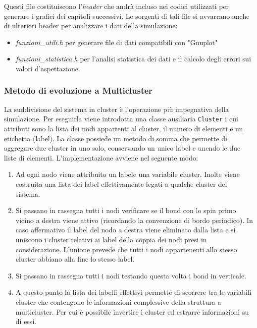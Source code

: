 \documentclass[11pt]{article}
\theoremstyle{plain}
\begin{document}
Questi file costituiscono l'\emph{header} che andrà incluso nei codici utilizzati per generare i grafici dei capitoli successivi. 
Le sorgenti di tali file si avvarrano anche di ulteriori header per analizzare i dati della simulazione:
\begin{itemize}
\item \emph{funzioni\_utili.h} per generare file di dati compatibili con "Gnuplot"
\item \emph{funzioni\_statistica.h} per l'analisi statistica dei dati e il calcolo degli errori sui valori d'aspettazione.
\end{itemize}

\subsubsection*{Metodo di evoluzione a Multicluster}
La suddivisione del sistema in cluster è l'operazione più impegnativa della simulazione. Per eseguirla viene introdotta una classe ausiliaria \texttt{Cluster} i cui attributi sono la lista dei nodi appartenti al cluster, il numero di elementi e un etichetta (label).
La classe possiede un metodo di somma che permette di aggregare due cluster in uno solo, conservando un unico label e unendo le due liste di elementi.
L'implementazione avviene nel seguente modo:
\begin{enumerate}
\item Ad ogni nodo viene attribuito un labele una variabile cluster. Inolte viene costruita una lista dei label effettivamente legati a qualche cluster del sistema.
\item Si passano in rassegna tutti i nodi verificare se il bond con lo spin primo vicino a destra viene attivo (ricordando la convenzione di bordo periodico).\newline
		In caso affermativo il label del nodo a destra viene eliminato dalla lista e si uniscono i cluster relativi ai label della coppia dei nodi presi in considerazione. L'unione prevede che tutti i nodi appartenenti allo stesso cluster abbiano alla fine lo stesso label.
\item Si passano in rassegna tutti i nodi testando questa volta i bond in verticale.
\item A questo punto la lista dei labelli effettivi permette di scorrere tra le variabili cluster che contengono le informazioni complessive della struttura a multicluster. Per cui è possibile invertire i cluster ed estrarre informazioni su di essi.
\end{enumerate}
\end{document}
